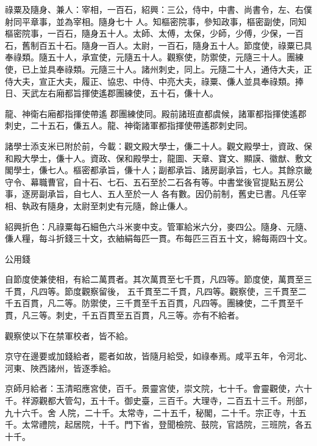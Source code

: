 \begin{pinyinscope}
 祿粟及隨身、兼人：宰相，一百石，紹興：三公，侍中，中書、尚書令，左、右僕射同平章事，並為宰相。隨身七十
 人。知樞密院事，參知政事，樞密副使，同知樞密院事，一百石，隨身五十人。太師、太傅，太保，少師，少傅，少保，一百石，舊制百五十石。隨身一百人。太尉，一百石，隨身五十人。節度使，祿粟已具奉祿類。隨五十人，承宣使，元隨五十人。觀察使，防禦使，元隨三十人。團練使，已上並具奉祿類。元隨三十人。諸州刺史，同上。元隨二十人，通侍大夫，正侍大夫，宣正大夫，履正、協忠、中侍、中亮大夫，祿粟、傔人並具奉祿類。捧日、天武左右廂都旨揮使遙郡團練使，五十石，傔十人。



 龍、神衛右廂都指揮使帶遙
 郡團練使同。殿前諸班直都虞候，諸軍都指揮使遙郡刺史，二十五石，傔五人。龍、神衛諸軍都指揮使帶遙郡刺史同。



 諸學士添支米已附於前，今載：觀文殿大學士，傔二十人。觀文殿學士，資政、保和殿大學士，傔十人。資政、保和殿學士，龍圖、天章、寶文、顯謨、徽猷、敷文閣學士，傔七人。樞密都承旨，傔十人；副都承旨、諸房副承旨，七人。其餘京畿守令、幕職曹官，自十石、七石、五石至於二石各有等。中書堂後官提點五房公事，逐房副承旨，自七人、五人至於一人
 各有數。因仍前制，舊史已書。凡任宰相、執政有隨身，太尉至刺史有元隨，餘止傔人。



 紹興折色：凡祿粟每石細色六斗米麥中支。管軍給米六分，麥四公。隨身、元隨、傔人糧，每斗折錢三十文，衣紬絹每匹一貫。布每匹三百五十文，綿每兩四十文。



 公用錢



 自節度使兼使相，有給二萬貫者。其次萬貫至七千貫，凡四等。節度使，萬貫至三千貫，凡四等。節度觀察留後，
 五千貫至二千貫，凡四等。觀察使，三千貫至二千五百貫，凡二等。防禦使，三千貫至千五百貫，凡四等。團練使，二千貫至千貫，凡三等。刺史，千五百貫至五百貫，凡三等。亦有不給者。



 觀察使以下在禁軍校者，皆不給。



 京守在邊要或加錢給者，罷者如故，皆隨月給受，如祿奉焉。咸平五年，令河北、河東、陜西諸州，皆逐季給。



 京師月給者：玉清昭應宮使，百千。景靈宮使，崇文院，七十千。會靈觀使，六十千。祥源觀都大管勾，五十千。御史臺，三百千。大理寺，二百五十三千。刑部，九十六千。舍
 人院，二十千。太常寺，二十五千，秘閣，二十千。宗正寺，十五千。太常禮院，起居院，十千。門下省，登聞檢院、鼓院，官誥院，三班院，各五十千。




\end{pinyinscope}
